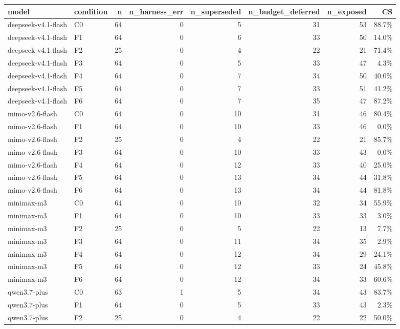 \begin{tabular}{llrrrrrr}
\toprule
model & condition & n & n\_harness\_err & n\_superseded & n\_budget\_deferred & n\_exposed & CS \\
\midrule
deepseek-v4.1-flash & C0 & 64 & 0 & 5 & 31 & 53 & 88.7\% \\
deepseek-v4.1-flash & F1 & 64 & 0 & 6 & 33 & 50 & 14.0\% \\
deepseek-v4.1-flash & F2 & 25 & 0 & 4 & 22 & 21 & 71.4\% \\
deepseek-v4.1-flash & F3 & 64 & 0 & 5 & 33 & 47 & 4.3\% \\
deepseek-v4.1-flash & F4 & 64 & 0 & 7 & 34 & 50 & 40.0\% \\
deepseek-v4.1-flash & F5 & 64 & 0 & 7 & 33 & 51 & 41.2\% \\
deepseek-v4.1-flash & F6 & 64 & 0 & 7 & 35 & 47 & 87.2\% \\
mimo-v2.6-flash & C0 & 64 & 0 & 10 & 31 & 46 & 80.4\% \\
mimo-v2.6-flash & F1 & 64 & 0 & 10 & 33 & 46 & 0.0\% \\
mimo-v2.6-flash & F2 & 25 & 0 & 4 & 22 & 21 & 85.7\% \\
mimo-v2.6-flash & F3 & 64 & 0 & 10 & 33 & 43 & 0.0\% \\
mimo-v2.6-flash & F4 & 64 & 0 & 12 & 33 & 40 & 25.0\% \\
mimo-v2.6-flash & F5 & 64 & 0 & 13 & 34 & 44 & 31.8\% \\
mimo-v2.6-flash & F6 & 64 & 0 & 13 & 34 & 44 & 81.8\% \\
minimax-m3 & C0 & 64 & 0 & 10 & 32 & 34 & 55.9\% \\
minimax-m3 & F1 & 64 & 0 & 10 & 33 & 33 & 3.0\% \\
minimax-m3 & F2 & 25 & 0 & 5 & 22 & 13 & 7.7\% \\
minimax-m3 & F3 & 64 & 0 & 11 & 34 & 35 & 2.9\% \\
minimax-m3 & F4 & 64 & 0 & 12 & 34 & 29 & 24.1\% \\
minimax-m3 & F5 & 64 & 0 & 12 & 33 & 24 & 45.8\% \\
minimax-m3 & F6 & 64 & 0 & 12 & 34 & 33 & 60.6\% \\
qwen3.7-plus & C0 & 63 & 1 & 5 & 34 & 43 & 83.7\% \\
qwen3.7-plus & F1 & 64 & 0 & 5 & 33 & 43 & 2.3\% \\
qwen3.7-plus & F2 & 25 & 0 & 4 & 22 & 22 & 50.0\% \\

\end{tabular}
